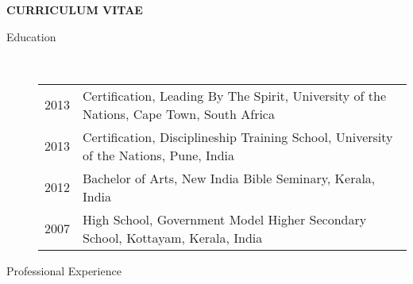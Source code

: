 \documentclass[10pt]{article}
\begin{document}

\begin{center}
{\Large \bf CURRICULUM VITAE\\
}
\end{center}
\smallskip

\bigskip
\begin{description}
\item [Education]\
\begin{tabular}{lp{4.5in}}
\hspace{-.2cm}2013 & Certification, Leading By The Spirit, {\sc  University of the Nations, Cape Town, South Africa}\\
\hspace{-.2cm}2013 & Certification, Disciplineship Training School,  {\sc University of the Nations, Pune, India}\\
\vspace{.1cm}\hspace{-.2cm}2012 &  Bachelor of Arts, {\sc New India Bible Seminary, Kerala, India} \\
\hspace{-.2cm}2007 & High School,  {\sc Government Model Higher Secondary School, Kottayam, Kerala, India}\\
\end{tabular}





\item [Professional Experience]\


\end{description}
\end{document}
